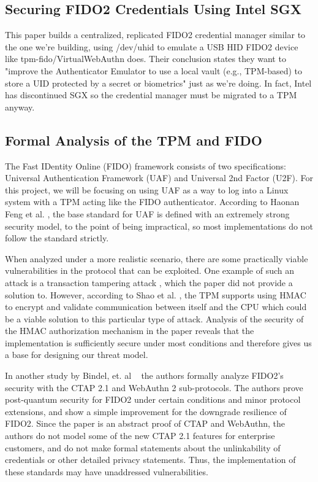 \documentclass[letterpaper,twocolumn,10pt]{article}
\begin{document}
\subsection{Securing FIDO2 Credentials Using Intel SGX~\cite{matos2026securing}}
This paper builds a centralized, replicated FIDO2
credential manager similar to the one we're building,
using /dev/uhid to emulate a USB HID FIDO2 device like
tpm-fido/VirtualWebAuthn does.
Their conclusion states they want to
"improve the Authenticator Emulator to use a local vault
(e.g., TPM-based) to store a UID protected by a secret
or biometrics" just as we're doing. In fact, Intel has
discontinued SGX
so the credential manager must be migrated to a TPM anyway.



\subsection{Formal Analysis of the TPM and FIDO}

The Fast IDentity Online (FIDO) framework consists of two specifications: 
Universal Authentication Framework (UAF) and Universal 2nd Factor (U2F). For this project,
we will be focusing on using UAF as a way to log into a Linux system with a TPM acting like the
FIDO authenticator. According to Haonan Feng et al. \cite{9930658}, the base standard for UAF is defined with an extremely strong security model,
to the point of being impractical, so most implementations do not follow the standard strictly.

    When analyzed under a more realistic scenario, there are some practically viable 
vulnerabilities in the protocol that can be exploited. One example of such an 
attack is a transaction tampering attack \cite{9930658}, which the paper did not provide a 
solution to. However, according to Shao et al. \cite{https://doi.org/10.1049/iet-ifs.2016.0005}, the TPM supports using HMAC to encrypt and validate communication between 
itself and the CPU which could be a viable 
solution to this particular type of attack. Analysis of the security of the HMAC authorization
mechanism in the paper reveals that the implementation is sufficiently secure under most 
conditions \cite{https://doi.org/10.1049/iet-ifs.2016.0005} and therefore gives us a base for 
designing our threat model. 

    In another study by Bindel, et. al ~\cite{bindel2023fido2ctap21webauthn2}
the authors formally analyze FIDO2's security with the CTAP 2.1 and WebAuthn 2 sub-protocols. The authors prove post-quantum security for
FIDO2 under certain conditions and minor protocol extensions, and show a simple improvement for the downgrade resilience of FIDO2.
Since the paper is an abstract proof of
CTAP and WebAuthn, the authors do not model some of the new CTAP 2.1 features for enterprise
customers, and do not make formal statements about the unlinkability of credentials or other detailed privacy statements.
Thus, the implementation of these standards may have unaddressed vulnerabilities.
\end{document}

